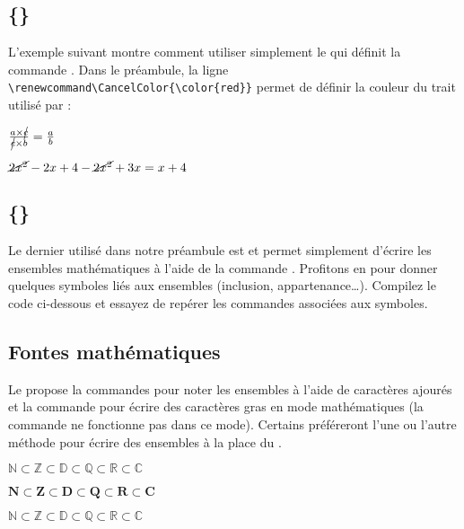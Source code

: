 \documentclass[10pt,french,openright,twoside]{book}
\begin{document}
\subsection{\{\}}

L'exemple suivant montre comment utiliser simplement le \package {} qui définit la commande . Dans le préambule, la ligne \verb!\renewcommand\CancelColor{\color{red}}! permet de définir la couleur du trait utilisé par  :\bigskip

{\NewFont\everymath{\textstyle}
\begin{SideBySideExample}
    $\frac{a \times \cancel{c}}{\cancel{c}\times b}
    = \frac a b$\par\medskip
    $\cancel{2x^2} - 2x + 4 - \cancel{2x^2} + 3x = x + 4$
\end{SideBySideExample}
}

\subsection{\{\}}

Le dernier \package utilisé dans notre préambule est  et permet simplement d'écrire les ensembles mathématiques à l'aide de la commande . Profitons en pour donner quelques symboles liés aux ensembles (inclusion, appartenance\dots). Compilez le code ci-dessous et essayez de repérer les commandes associées aux symboles.


\subsection{Fontes mathématiques}

Le \package {} propose la commandes  pour noter les ensembles à l'aide de caractères ajourés et la commande  pour écrire des caractères gras en mode mathématiques (la commande  ne fonctionne pas dans ce mode). Certains préféreront l'une ou l'autre méthode pour écrire des ensembles à la place du \package {}.\bigskip

{\NewFont
\begin{SideBySideExample}
    $\mathbb N \subset \mathbb Z \subset \mathbb D
    \subset \mathbb Q\subset \mathbb R \subset \mathbb C$

    $\mathbf N \subset \mathbf Z \subset \mathbf D
    \subset \mathbf Q\subset \mathbf R \subset \mathbf C$

    $\mathds N \subset \mathds Z \subset \mathds D
    \subset \mathds Q\subset \mathds R \subset \mathds C$
\end{SideBySideExample}
}
\bigskip
\end{document}
